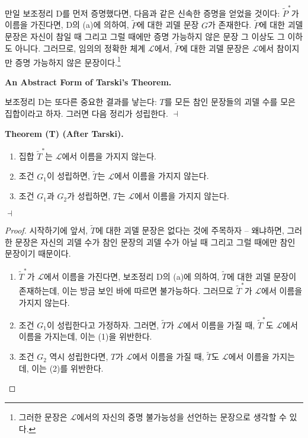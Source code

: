 \documentclass[12pt]{paper}
\newenvironment{context}[1][]
{ \noindent \textbf{{#1}.}
}
{ \hfill $ \dashv $
}
\begin{document}
  만일 보조정리 D를 먼저 증명했다면, 다음과 같은 신속한 증명을 얻었을 것이다:
  $\tilde{P}^{*}$가 이름을 가진다면, D의 (a)에 의하여, $\tilde{P}$에 대한 괴델 문장 $G$가 존재한다.
  $\tilde{P}$에 대한 괴델 문장은 자신이 참일 때 그리고 그럴 때에만 증명 가능하지 않은 문장 그 이상도 그 이하도 아니다.
  그러므로, 임의의 정확한 체계 $\mathcal{L}$에서, $\tilde{P}$에 대한 괴델 문장은 $\mathcal{L}$에서 참이지만 증명 가능하지 않은 문장이다.\footnote
  {
    그러한 문장은 $\mathcal{L}$에서의 자신의 증명 불가능성을 선언하는 문장으로 생각할 수 있다.
  }

  \begin{context}[An Abstract Form of Tarski's Theorem]
    보조정리 D는 또다른 중요한 결과를 낳는다:
    $T$를 모든 참인 문장들의 괴델 수를 모은 집합이라고 하자.
    그러면 다음 정리가 성립한다.
  \end{context}

  \begin{context}[Theorem (T) (After Tarski)]
    \begin{enumerate}
      \item 집합 $\tilde{T}^{*}$는 $\mathcal{L}$에서 이름을 가지지 않는다.
      \item 조건 $G_1$이 성립하면, $\tilde{T}$는 $\mathcal{L}$에서 이름을 가지지 않는다.
      \item 조건 $G_1$과 $G_2$가 성립하면, $T$는 $\mathcal{L}$에서 이름을 가지지 않는다.
    \end{enumerate}
  \end{context}

  \begin{proof}
    시작하기에 앞서, $\tilde{T}$에 대한 괴델 문장은 없다는 것에 주목하자 --
    왜냐하면, 그러한 문장은 자신의 괴델 수가 참인 문장의 괴델 수가 아닐 때 그리고 그럴 때에만 참인 문장이기 때문이다.
    \begin{enumerate}
      \item $\tilde{T}^{*}$가 $\mathcal{L}$에서 이름을 가진다면, 보조정리 D의 (a)에 의하여,
      $\tilde{T}$에 대한 괴델 문장이 존재하는데, 이는 방금 보인 바에 따르면 불가능하다.
      그러므로 $\tilde{T}^{*}$가 $\mathcal{L}$에서 이름을 가지지 않는다.
      
      \item 조건 $G_1$이 성립한다고 가정하자.
      그러면, $\tilde{T}$가 $\mathcal{L}$에서 이름을 가질 때,
      $\tilde{T}^{*}$도 $\mathcal{L}$에서 이름을 가지는데,
      이는 (1)을 위반한다.
      
      \item 조건 $G_2$ 역시 성립한다면,
      $T$가 $\mathcal{L}$에서 이름을 가질 때,
      $\tilde{T}$도 $\mathcal{L}$에서 이름을 가지는데,
      이는 (2)를 위반한다.
    \end{enumerate}
  \end{proof}
\end{document}
